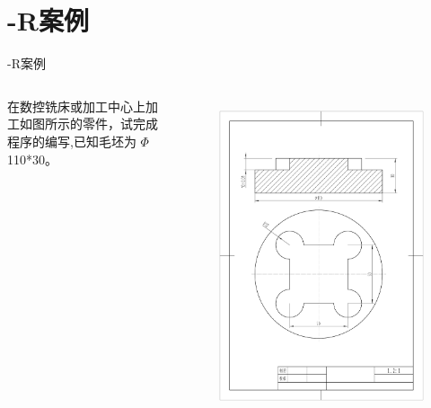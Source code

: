 \documentclass[UTF8,zihao=-4]{ctexbeamer}
\begin{document}
\section{-R案例}
\begin{frame}{-R案例}
    \begin{columns}
        在数控铣床或加工中心上加工如图所示的零件，试完成程序的编写,已知毛坯为 $\Phi$ 110*30。
        
        \begin{figure}
            \centering
            \includegraphics[width=0.8\linewidth,trim=50 150 50 100,clip]{image/5-2.jpg}
            \label{fig:5-2}
        \end{figure}
    \end{columns}
\end{frame}
\end{document}
